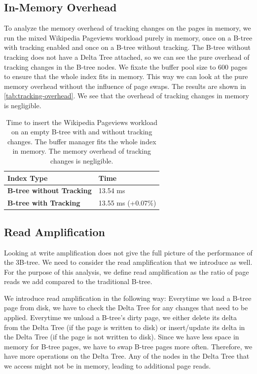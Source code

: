 \subsection{In-Memory Overhead}
To analyze the memory overhead of tracking changes on the pages in memory, we run the mixed Wikipedia Pageviews workload purely in memory, once on a B-tree with tracking enabled and once on a B-tree without tracking.
The B-tree without tracking does not have a Delta Tree attached, so we can see the pure overhead of tracking changes in the B-tree nodes.
We fixate the buffer pool size to 600 pages to ensure that the whole index fits in memory.
This way we can look at the pure memory overhead without the influence of page swaps.
The results are shown in \autoref{tab:tracking-overhead}.
We see that the overhead of tracking changes in memory is negligible.

\begin{table}[ht]
\centering
\begin{tabular}{l|l}
\toprule
\textbf{Index Type} & Time \\
\midrule
\textbf{B-tree without Tracking}  & 13.54 ms \\
\textbf{B-tree with Tracking}  & 13.55 ms (+0.07\%) \\
\bottomrule
\end{tabular}
\caption{Time to insert the Wikipedia Pageviews workload on an empty B-tree with and without tracking changes. The buffer manager fits the whole index in memory. The memory overhead of tracking changes is negligible.}
\label{tab:tracking-overhead}
\end{table}

\subsection{Read Amplification}
Looking at write amplification does not give the full picture of the performance of the 3B-tree.
We need to consider the read amplification that we introduce as well.
For the purpose of this analysis, we define read amplification as the ratio of page reads we add compared to the traditional B-tree.

We introduce read amplification in the following way:
Everytime we load a B-tree page from disk, we have to check the Delta Tree for any changes that need to be applied.
Everytime we unload a B-tree's dirty page, we either delete its delta from the Delta Tree (if the page is written to disk) or insert/update its delta in the Delta Tree (if the page is not written to disk).
Since we have less space in memory for B-tree pages, we have to swap B-tree pages more often.
Therefore, we have more operations on the Delta Tree.
Any of the nodes in the Delta Tree that we access might not be in memory, leading to additional page reads.

